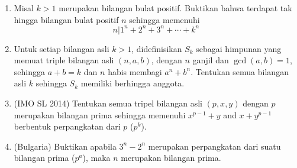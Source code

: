 \documentclass[11pt]{scrartcl}
\begin{document}
\begin{enumerate}[resume]
    \item  Misal $ k > 1$ merupakan bilangan bulat positif. Buktikan bahwa terdapat tak hingga bilangan bulat positif $n$ sehingga memenuhi
    $$n | 1^n + 2^n + 3^n + \cdots +k^n$$

    \item Untuk setiap bilangan asli $k>1$, didefinisikan $S_k$ sebagai himpunan yang memuat triple bilangan asli $(n,a,b)$, dengan $n$ ganjil dan $\gcd (a,b)=1$, sehingga $a+b=k$ dan $n$ habis membagi $a^n+b^n$. Tentukan semua bilangan asli $k$ sehingga $S_k$ memiliki berhingga anggota.

    \item (IMO SL 2014) Tentukan semua tripel bilangan asli $(p, x, y)$ dengan $p$ merupakan bilangan prima sehingga memenuhi $x^{p -1} + y$ and $x + y^ {p -1}$ berbentuk perpangkatan dari $p$ ($p^k$). 

    \item (Bulgaria) Buktikan apabila $3^n-2^n$ merupakan perpangkatan dari suatu bilangan prima ($p^a$), maka $n$ merupakan bilangan prima.
\end{enumerate}
\end{document}
